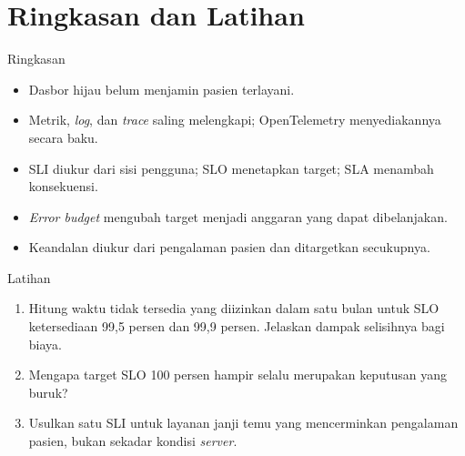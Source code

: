 \documentclass[aspectratio=169, table, 12pt]{beamer}
\begin{document}
\section{Ringkasan dan Latihan}

\begin{frame}{{\Large Ringkasan}}
  \vspace{6pt}
  \small
  \begin{itemize}
    \item Dasbor hijau belum menjamin pasien terlayani.
    \item Metrik, \textit{log}, dan \textit{trace} saling melengkapi; OpenTelemetry
          menyediakannya secara baku.
    \item SLI diukur dari sisi pengguna; SLO menetapkan target; SLA menambah konsekuensi.
    \item \textit{Error budget} mengubah target menjadi anggaran yang dapat dibelanjakan.
    \item Keandalan diukur dari pengalaman pasien dan ditargetkan secukupnya.
  \end{itemize}
\end{frame}

\begin{frame}{{\Large Latihan}}
  \vspace{6pt}
  \small
  \begin{enumerate}
    \item Hitung waktu tidak tersedia yang diizinkan dalam satu bulan untuk SLO
          ketersediaan 99,5 persen dan 99,9 persen. Jelaskan dampak selisihnya bagi biaya.
    \item Mengapa target SLO 100 persen hampir selalu merupakan keputusan yang buruk?
    \item Usulkan satu SLI untuk layanan janji temu yang mencerminkan pengalaman pasien,
          bukan sekadar kondisi \textit{server}.
  \end{enumerate}
\end{frame}
\end{document}
